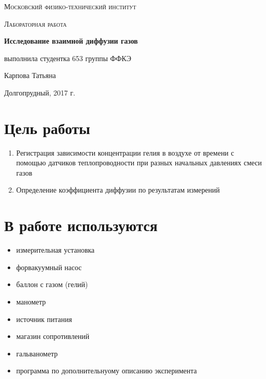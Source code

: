 \documentclass{article}
\begin{document}
\begin{titlepage}
	\centering
	{\scshape\LARGE Московский физико-технический институт \par}
	\vspace{3cm}
	{\scshape\Large Лабораторная работа \par}
	\vspace{1cm}
	{\huge\bfseries Исследование взаимной диффузии газов \par}
	\vspace{1cm}
	\vfill
\begin{flushright}
	{\large выполнила студентка 653 группы ФФКЭ}\par
	\vspace{0.3cm}
	{\LARGE Карпова Татьяна}
\end{flushright}
	

	\vfill

	Долгопрудный, 2017 г.
\end{titlepage}

\section{Цель работы}
\begin{enumerate}
    \item Регистрация зависимости концентрации гелия в воздухе от времени с помощью датчиков теплопроводности при разных начальных давлениях смеси газов
    \item Определение коэффициента диффузии по результатам измерений
\end{enumerate}

\section{В работе используются}
\begin{itemize}
    \item измерительная установка
    \item форвакуумный насос
    \item баллон с газом (гелий)
    \item манометр
    \item источник питания
    \item магазин сопротивлений
    \item гальванометр
    \item программа по дополнительнуому описанию эксперимента
\end{itemize}
\end{document}
